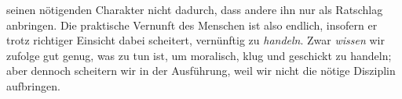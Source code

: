 seinen nötigenden Charakter nicht dadurch, dass andere ihn nur als Ratschlag
anbringen.
Die praktische Vernunft des Menschen ist also endlich, insofern er trotz
richtiger Einsicht dabei scheitert, vernünftig zu \emph{handeln}. Zwar
\emph{wissen} wir  zufolge gut genug, was zu tun ist, um moralisch, klug und
geschickt zu handeln; aber dennoch scheitern wir in der Ausführung, weil wir
nicht die nötige Disziplin aufbringen.
\begin{comment}
Die Fehlbarkeit endlicher Wesen in der Ausübung der praktischen Vernunft besteht
oft nicht darin, dass die entsprechenden Erkenntnisse nicht verfügbar wären, sondern
darin, dass trotz korrekter Einsicht die Ausführung unterbleibt. Den
paradigmatischen Fall finden wir bei moralischen Verfehlungen, bei denen wir
davon ausgehen können, dass kein Mangel an moralischer Einsicht vorliegt,
sondern an korrekter Umsetzung vorhandener Einsichten. Ein nicht-endlicher
(ein \singlequote{heiliger}) Wille unterliegt denselben moralischen Gesetzen,
die auch uns bekannt sind (er ist uns kognitiv möglicherweise bloß gleichwertig);
aber wenngleich er dieselben moralischen Gesetze \emph{erkennt}, so \emph{handelt}
darüber hinaus auch stets nach ihnen:
\begin{quote}
  Ein vollkommen guter Wille würde also eben sowohl unter objektiven Gesetzen
  (des Guten) stehen, aber nicht dadurch als zu gesetzmäßigen Handlungen
  \ori{genötigt} vorgestellt werden können, weil er von selbst, nach seiner
  subjektiven Beschaffenheit, nur durch die Vorstellung des Guten bestimmt 
  werden kann. Daher gelten für den \ori{göttlichen} und überhaupt für einen
  \ori{heiligen} Willen keine Imperativen; das \ori{Sollen} ist hier am
  unrechten Orte, weil das \ori{Wollen} schon von selbst mit dem Gesetz
  notwendig einstimmig
  ist.\footnote{\cite[][BA 39]{Kant:GrundlegungzurMetaphysikderSitten1965},
  \cite[][IV: 414.1--8]{Kant:GesammelteWerke1900ff.}. Siehe auch
  \cite[][\S~76]{Kant:KritikderUrteilskraft2009},
  \cite[][V: 403.20--404.16]{Kant:GesammelteWerke1900ff.}.}
\end{quote}
Imperative gibt es nur für endliche Wesen, weil ein Wesen mit einem
nicht-endlichen Willen zur Befolgung vernünftiger Grundsätze nicht aufgefordert
werden müsste.\footnote{Auch in Vorlesungen hat \name[Immanuel]{Kant} diesen
Zusammenhang regelmäßig hervorgehoben. Siehe etwa
\cite{Kant:MoralphilosophieCollins1974}, \cite[][XXVII:
256.14--37]{Kant:GesammelteWerke1900ff.}: \enquote{Der göttliche Wille ist in
Ansehung der Moralitaet nothwendig, aber der menschliche Wille ist nicht

\end{comment}
